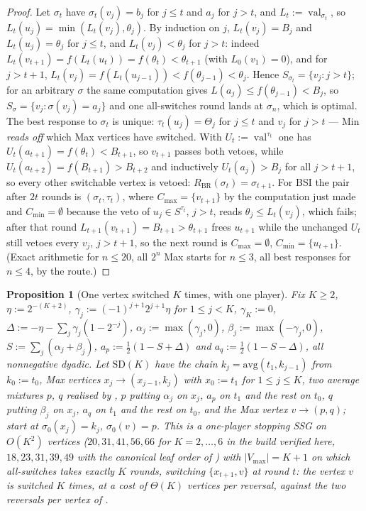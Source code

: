\documentclass[11pt]{article}
\theoremstyle{plain}
\newtheorem{proposition}[theorem]{Proposition}
\theoremstyle{definition}
\DeclareMathOperator{\val}{val}
\newcommand{\Vmax}{V_{\max}}
\begin{document}
\begin{proof}
Let $\sigma_t$ have $\sigma_t(v_j)=b_j$ for $j\le t$ and $a_j$ for
$j>t$, and $L_t:=\val_{\sigma_t}$, so $L_t(u_j)=\min(L_t(v_j),\theta_j)$.
By induction on $j$, $L_t(v_j)=B_j$ and $L_t(u_j)=\theta_j$ for $j\le t$,
and $L_t(v_j)<\theta_j$ for $j>t$: indeed
$L_t(v_{t+1})=f(L_t(u_t))=f(\theta_t)<\theta_{t+1}$ (with $L_0(v_1)=0$),
and for $j>t+1$, $L_t(v_j)=f(L_t(u_{j-1}))<f(\theta_{j-1})<\theta_j$.
Hence $S_{\sigma_t}=\{v_j:j>t\}$; for an arbitrary $\sigma$ the same
computation gives $L(a_j)\le f(\theta_{j-1})<B_j$, so
$S_\sigma=\{v_j:\sigma(v_j)=a_j\}$ and one all-switches round lands at
$\sigma_n$, which is optimal. The best response to $\sigma_t$ is unique:
$\tau_t(u_j)=\Theta_j$ for $j\le t$ and $v_j$ for $j>t$ --- Min
\emph{reads off} which Max vertices have switched. With
$U_t:=\val^{\tau_t}$ one has $U_t(a_{t+1})=f(\theta_t)<B_{t+1}$, so
$v_{t+1}$ passes both vetoes, while $U_t(a_{t+2})=f(B_{t+1})>B_{t+2}$
and inductively $U_t(a_j)>B_j$ for all $j>t+1$, so every other
switchable vertex is vetoed: $R_{\mathrm{BR}}(\sigma_t)=\sigma_{t+1}$.
For BSI the pair after $2t$ rounds is $(\sigma_t,\tau_t)$, where
$C_{\max}=\{v_{t+1}\}$ by the computation just made and
$C_{\min}=\emptyset$ because the veto of $u_j\in S^{\tau_t}$, $j>t$,
reads $\theta_j\le L_t(v_j)$, which fails; after that round
$L_{t+1}(v_{t+1})=B_{t+1}>\theta_{t+1}$ frees $u_{t+1}$ while the
unchanged $U_t$ still vetoes every $v_j$, $j>t+1$, so the next round is
$C_{\max}=\emptyset$, $C_{\min}=\{u_{t+1}\}$. (Exact arithmetic for
$n\le20$, all $2^{n}$ Max starts for $n\le3$, all best responses for
$n\le4$, by the route.)
\end{proof}

\begin{proposition}[One vertex switched $K$ times, with one player]\label{prop:leapfrog}
Fix $K\ge2$, $\eta:=2^{-(K+2)}$, $\gamma_j:=(-1)^{j+1}2^{j+1}\eta$ for
$1\le j<K$, $\gamma_K:=0$, $\Delta:=-\eta-\sum_j\gamma_j(1-2^{-j})$,
$\alpha_j:=\max(\gamma_j,0)$, $\beta_j:=\max(-\gamma_j,0)$,
$S:=\sum_j(\alpha_j+\beta_j)$, $a_p:=\tfrac12(1-S+\Delta)$ and
$a_q:=\tfrac12(1-S-\Delta)$, all nonnegative dyadic. Let $\mathrm{SD}(K)$
have the chain $k_j=\mathrm{avg}(t_1,k_{j-1})$ from $k_0:=t_0$, Max
vertices $x_j\to(x_{j-1},k_j)$ with $x_0:=t_1$ for $1\le j\le K$, two
average mixtures $p$, $q$ realised by , $p$ putting
$\alpha_j$ on $x_j$, $a_p$ on $t_1$ and the rest on $t_0$, $q$ putting
$\beta_j$ on $x_j$, $a_q$ on $t_1$ and the rest on $t_0$, and the Max
vertex $v\to(p,q)$; start at $\sigma_0(x_j)=k_j$, $\sigma_0(v)=p$. This is
a one-player stopping SSG on $O(K^{2})$ vertices ($20,31,41,56,66$ for
$K=2,\dots,6$ in the build verified here, $18,23,31,39,49$ with the
canonical leaf order of ) with $|\Vmax|=K+1$ on
which all-switches takes exactly $K$ rounds, switching $\{x_{t+1},v\}$ at
round $t$: the vertex $v$ is switched $K$ times, at a cost of $\Theta(K)$
vertices per reversal, against the two reversals per vertex of
.
\end{proposition}
\end{document}
